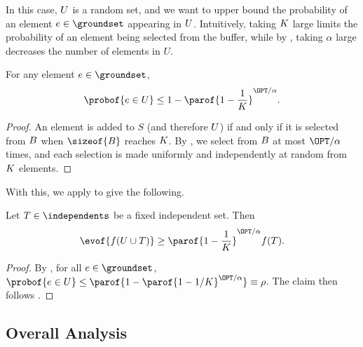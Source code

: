 \documentclass[oneside,letterpaper]{scrartcl} \usepackage{macros}
\begin{document}
In this case, $U$ is a random set, and we want to upper bound
the probability of an element $e \in \groundset$ appearing in
$U$. Intuitively, taking $K$ large limits the
probability of an element being selected from the buffer, while by
, taking $\alpha$ large decreases
the number of elements in $U$.
\begin{lemma}
  For any element $e \in \groundset$,
  \begin{align*}
    \probof{e \in \takens} \leq 1 - \parof{1 -
      \frac{1}{\bufferlimit}}^{\OPT/\alpha}.
  \end{align*}
\end{lemma}
\begin{proof}
  An element is added to $S$ (and therefore $U$) if and only if
  it is selected from $B$ when $\sizeof{\buffer}$ reaches
  $K$. By , we select
  from $B$ at most $\OPT/\alpha$ times, and each selection is
  made uniformly and independently at random from $K$
  elements.
\end{proof}

With this, we apply  to give the following.
\begin{lemma} Let $T \in \independents$
  be a fixed independent set. Then
  \begin{align*}
    \evof{f(U \cup T)} \geq \parof{1 -
      \frac{1}{\bufferlimit}}^{\OPT/\alpha} f(T).
  \end{align*}
\end{lemma}
\begin{proof}
  By , for all $e \in \groundset$,
  $\probof{e \in U} \leq \parof{1 - \parof{1 -
      1/\bufferlimit}^{\OPT/\alpha}} \equiv \rho$. The claim then
  follows .
\end{proof}

\subsection{Overall Analysis}
\end{document}

